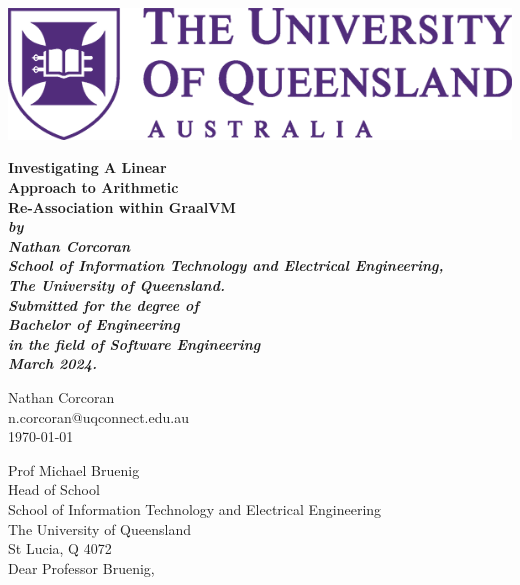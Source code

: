 \documentclass[12pt,openany,a4paper]{book}
\renewcommand{\baselinestretch}{1.2}	%
\begin{document}
\frontmatter

\begin{titlepage}
\begin{center}
\includegraphics[width=\linewidth]{UQLogo.png}
\end{center}
\renewcommand{\baselinestretch}{1.0}
\begin{center}
\vspace*{35mm}
\Huge\bf
        Investigating A Linear\\
        Approach to Arithmetic\\
        Re-Association within GraalVM\\
\vspace{20mm}
\large\sl
		by\\
		Nathan Corcoran
		\medskip\\
\rm
		School of Information Technology and Electrical Engineering,\\
		The University of Queensland.\\
\vspace{30mm}
		Submitted for the degree of\\
		Bachelor of Engineering
		\smallskip\\
\normalsize
		in the field of Software Engineering
		\medskip\\
\large
		March 2024.
\end{center}
\end{titlepage}

\cleardoublepage

\begin{flushright}
    Nathan Corcoran\\
    n.corcoran@uqconnect.edu.au\\
	\medskip
	\today
\end{flushright}
\begin{flushleft}
  Prof Michael Bruenig\\
  Head of School\\
  School of Information Technology and Electrical Engineering\\
  The University of Queensland\\
  St Lucia, Q 4072\\
  \bigskip\bigskip
  Dear Professor Bruenig,
\end{flushleft}
\end{document}
